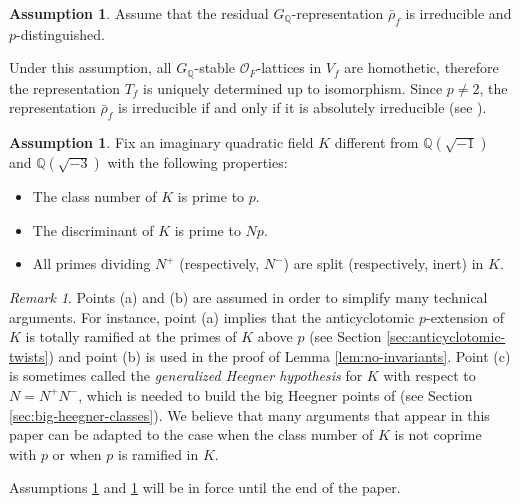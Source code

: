 \documentclass[12pt,reqno]{amsart}
\theoremstyle{definition}
\newtheorem{assumption}[theorem]{Assumption}
\theoremstyle{remark}
\newtheorem{remark}[theorem]{Remark}
\newcommand{\numberset}{\mathbb}
\newcommand{\Q}{\numberset{Q}}
\newcommand{\OF}{\mathcal{O}_F}
\begin{document}
 \begin{assumption}\label{ass:residual-representation-irreducible}
     Assume that the residual $G_\Q$-representation $\bar{\rho}_{f}$ is irreducible and $p$-distinguished. 
 \end{assumption}

 Under this assumption, all $G_\Q$-stable $\OF$-lattices in $V_f$ are homothetic, therefore the representation $T_f$ is uniquely determined up to isomorphism. Since $p\ne 2$, the representation $\bar{\rho}_{f}$ is irreducible if and only if it is absolutely irreducible (see \cite[Remark 2.5]{Vigni22:shafarevich-tate-groups}).

 

 \begin{assumption}\label{ass:field-K}
 Fix an imaginary quadratic field $K$ different from $\Q(\sqrt{-1})$ and $\Q(\sqrt{-3})$ with the following properties:
		\begin{itemize}
			\item[(a)] The class number of $K$ is prime to $p$.
			\item[(b)] The discriminant of $K$ is prime to $Np$.
			\item[(c)] All primes dividing $N^+$ (respectively, $N^-$) are split (respectively, inert) in $K$.
		\end{itemize}
\end{assumption}

\begin{remark}
    Points (a) and (b) are assumed in order to simplify many technical arguments. For instance, point (a) implies that the anticyclotomic $p$-extension of $K$ is totally ramified at the primes of $K$ above $p$ (see Section \ref{sec:anticyclotomic-twists}) and point (b) is used in the proof of Lemma \ref{lem:no-invariants}. Point (c) is sometimes called the \emph{generalized Heegner hypothesis} for $K$ with respect to $N=N^+N^-$, which is needed to build the big Heegner points of \cite{Longo-Vigni11:quaternion-algebras-Hida-families} (see Section \ref{sec:big-heegner-classes}). We believe that many arguments that appear in this paper can be adapted to the case when the class number of $K$ is not coprime with $p$ or when $p$ is ramified in $K$.
\end{remark}

Assumptions \ref{ass:residual-representation-irreducible} and \ref{ass:field-K} will be in force until the end of the paper.
\end{document}
